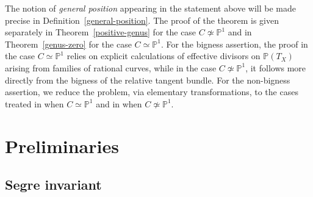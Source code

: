 \documentclass[reqno]{amsart}
\theoremstyle{definition}
\newcommand{\PP}{\mathbb{P}}
\newcommand{\Ee}{\mathcal{E}}
\newcommand{\bb}{\mathfrak{b}}
\newcommand{\kk}{\mathfrak{k}}
\newcommand{\tS}{X}
\begin{document}
The notion of \emph{general position} appearing in the statement above will be made precise in Definition~\ref{general-position}.
The proof of the theorem is given separately in Theorem~\ref{positive-genus} for the case $C\not\simeq \PP^1$ and in Theorem~\ref{genus-zero} for the case $C\simeq\PP^1$.
For the bigness assertion, the proof in the case $C\simeq\PP^1$ relies on explicit calculations of effective divisors on $\PP(T_{\tS})$ arising from families of rational curves, while in the case $C\not\simeq\PP^1$, it follows more directly from the bigness of the relative tangent bundle.
For the non-bigness assertion, we reduce the problem, via elementary transformations, to the cases treated in \cite{KKL24} when $C\simeq\PP^1$ and in \cite{Kim23} when $C\not\simeq\PP^1$.



\section{Preliminaries}

\subsection{Segre invariant}
\end{document}
